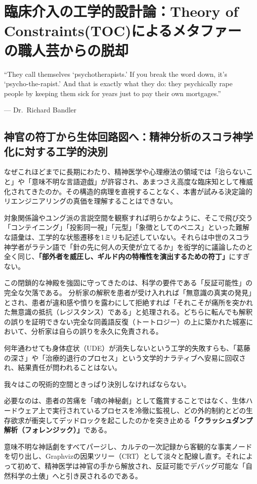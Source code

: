 \chapter{臨床介入の工学的設計論：Theory of Constraints(TOC)によるメタファーの職人芸からの脱却}
\epigraph{
``They call themselves `psychotherapists.' If you break the word down, it's `psycho-the-rapist.' And that is exactly what they do: they psychically rape people by keeping them sick for years just to pay their own mortgages.''
}{--- Dr.~Richard Bandler}
\section{神官の符丁から生体回路図へ：精神分析のスコラ神学化に対する工学的決別}

なぜこれほどまでに長期にわたり、精神医学や心理療法の領域では「治らないこと」や「意味不明な言語遊戯」が許容され、あまつさえ高度な臨床知として権威化されてきたのか。その構造的病理を直視することなく、本書が試みる決定論的リエンジニアリングの真価を理解することはできない。

対象関係論やユング派の言説空間を観察すれば明らかなように、そこで飛び交う「コンテイニング」「投影同一視」「元型」「象徴としてのペニス」といった難解な語彙は、工学的な状態遷移を1ミリも記述していない。それらは中世のスコラ神学者がラテン語で「針の先に何人の天使が立てるか」を衒学的に議論したのと全く同じ、\textbf{「部外者を威圧し、ギルド内の特権性を演出するための符丁」}にすぎない。

この閉鎖的な神殿を強固に守ってきたのは、科学の要件である「反証可能性」の完全な欠落である。
分析家の解釈を患者が受け入れれば「無意識の真実の発見」とされ、患者が違和感や憤りを露わにして拒絶すれば「それこそが痛所を突かれた無意識の抵抗（レジスタンス）である」と処理される。どちらに転んでも解釈の誤りを証明できない完全な同義語反復（トートロジー）の上に築かれた城塞において、分析家は自らの誤りを永久に免責される。

何年通わせても身体症状（UDE）が消失しないという工学的失敗すらも、「葛藤の深さ」や「治療的退行のプロセス」という文学的ナラティブへ安易に回収され、結果責任が問われることはない。

我々はこの呪術的空間ときっぱり決別しなければならない。

必要なのは、患者の苦痛を「魂の神秘劇」として鑑賞することではなく、生体ハードウェア上で実行されているプロセスを冷徹に監視し、どの外的制約とどの生存欲求が衝突してデッドロックを起こしたのかを突き止める\textbf{「クラッシュダンプ解析（フォレンジック）」}である。

意味不明な神話劇をすべてパージし、カルテの一次記録から客観的な事実ノードを切り出し、Graphvizの因果ツリー（CRT）として淡々と配線し直す。それによって初めて、精神医学は神官の手から解放され、反証可能でデバッグ可能な「自然科学の土俵」へと引き戻されるのである。


